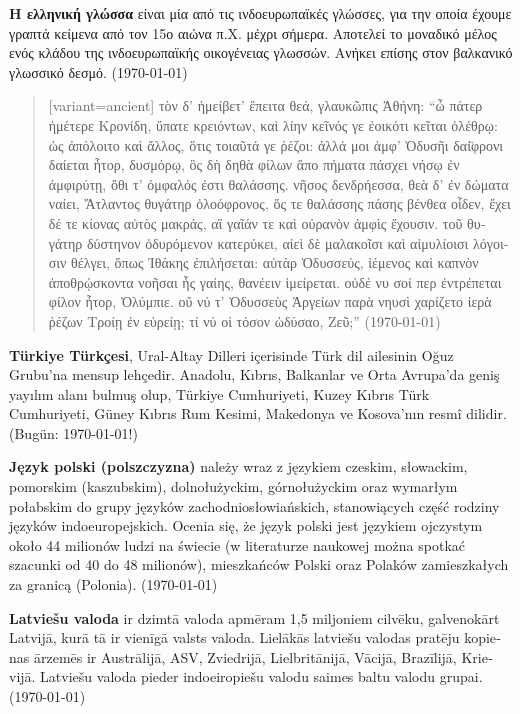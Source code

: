 \documentclass[a4paper]{article}
\begin{document}
\begin{greek}
\textbf{Η ελληνική γλώσσα} είναι μία από τις ινδοευρωπαϊκές γλώσσες, για την
οποία έχουμε γραπτά κείμενα από τον 15ο αιώνα π.Χ. μέχρι σήμερα. Αποτελεί το
μοναδικό μέλος ενός κλάδου της ινδοευρωπαϊκής οικογένειας γλωσσών. Ανήκει
επίσης στον βαλκανικό γλωσσικό δεσμό.	
(\today) 
\end{greek}
\bigskip

\begin{quote}
\begin{greek}[variant=ancient]
τὸν δ' ἠμείβετ' ἔπειτα θεά, γλαυκῶπις Ἀθήνη:
“ὦ πάτερ ἡμέτερε Κρονίδη, ὕπατε κρειόντων,
καὶ λίην κεῖνός γε ἐοικότι κεῖται ὀλέθρῳ:
ὡς ἀπόλοιτο καὶ ἄλλος, ὅτις τοιαῦτά γε ῥέζοι:
ἀλλά μοι ἀμφ' Ὀδυσῆι δαί̈φρονι δαίεται ἦτορ,
δυσμόρῳ, ὃς δὴ δηθὰ φίλων ἄπο πήματα πάσχει
νήσῳ ἐν ἀμφιρύτῃ, ὅθι τ' ὀμφαλός ἐστι θαλάσσης.
νῆσος δενδρήεσσα, θεὰ δ' ἐν δώματα ναίει,
Ἄτλαντος θυγάτηρ ὀλοόφρονος, ὅς τε θαλάσσης
πάσης βένθεα οἶδεν, ἔχει δέ τε κίονας αὐτὸς
μακράς, αἳ γαῖάν τε καὶ οὐρανὸν ἀμφὶς ἔχουσιν.
τοῦ θυγάτηρ δύστηνον ὀδυρόμενον κατερύκει,
αἰεὶ δὲ μαλακοῖσι καὶ αἱμυλίοισι λόγοισιν
θέλγει, ὅπως Ἰθάκης ἐπιλήσεται: αὐτὰρ Ὀδυσσεύς,
ἱέμενος καὶ καπνὸν ἀποθρῴσκοντα νοῆσαι
ἧς γαίης, θανέειν ἱμείρεται. οὐδέ νυ σοί περ
ἐντρέπεται φίλον ἦτορ, Ὀλύμπιε. οὔ νύ τ' Ὀδυσσεὺς
Ἀργείων παρὰ νηυσὶ χαρίζετο ἱερὰ ῥέζων
Τροίῃ ἐν εὐρείῃ; τί νύ οἱ τόσον ὠδύσαο, Ζεῦ;”
(\today)
\end{greek}
\end{quote}
\bigskip

\begin{turkish}
\textbf{Türkiye Türkçesi}, Ural-Altay Dilleri içerisinde Türk dil ailesinin Oğuz Grubu'na mensup lehçedir. Anadolu, Kıbrıs, Balkanlar ve Orta Avrupa'da geniş yayılım alanı bulmuş olup, Türkiye Cumhuriyeti, Kuzey Kıbrıs Türk Cumhuriyeti, Güney Kıbrıs Rum Kesimi, Makedonya ve Kosova'nın resmî dilidir.
(Bugün: \today!)
\end{turkish}
\bigskip

\begin{polish}
\textbf{Język polski (polszczyzna)} należy wraz z językiem czeskim, słowackim, pomorskim (kaszubskim), dolnołużyckim, górnołużyckim oraz wymarłym połabskim do grupy języków zachodniosłowiańskich, stanowiących część rodziny języków indoeuropejskich. Ocenia się, że język polski jest językiem ojczystym około 44 milionów ludzi na świecie (w literaturze naukowej można spotkać szacunki od 40 do 48 milionów), mieszkańców Polski oraz Polaków zamieszkałych za granicą (Polonia).
(\today)
\end{polish}
\bigskip

\begin{latvian} 
\textbf{Latviešu valoda} ir dzimtā valoda apmēram 1,5 miljoniem cilvēku, galvenokārt Latvijā, kurā tā ir vienīgā valsts valoda. Lielākās latviešu valodas pratēju kopienas ārzemēs ir Austrālijā, ASV, Zviedrijā, Lielbritānijā, Vācijā, Brazīlijā, Krievijā. Latviešu valoda pieder indoeiropiešu valodu saimes baltu valodu grupai.
(\today)
\end{latvian}
\end{document}
